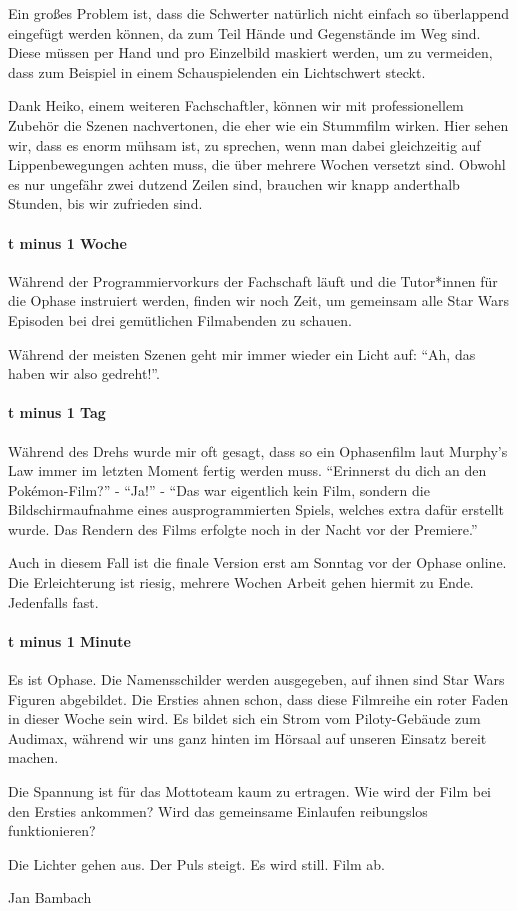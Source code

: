 {Ein großes Problem ist, dass die Schwerter natürlich nicht einfach so
überlappend eingefügt werden können, da zum Teil Hände und Gegenstände im Weg
sind. Diese müssen per Hand und pro Einzelbild maskiert werden, um zu
vermeiden, dass zum Beispiel in einem Schauspielenden ein Lichtschwert steckt.

Dank Heiko, einem weiteren Fachschaftler, können wir mit professionellem
Zubehör die Szenen nachvertonen, die eher wie ein Stummfilm wirken. Hier sehen
wir, dass es enorm mühsam ist, zu sprechen, wenn man dabei gleichzeitig
auf Lippenbewegungen achten muss, die über mehrere Wochen versetzt sind. Obwohl
es nur ungefähr zwei dutzend Zeilen sind, brauchen wir knapp anderthalb
Stunden, bis wir zufrieden sind.
\paragraph{t minus 1 Woche}
Während der Programmiervorkurs der Fachschaft läuft und die Tutor*innen für die
Ophase instruiert werden, finden wir noch Zeit, um gemeinsam alle Star Wars
Episoden bei drei gemütlichen Filmabenden zu schauen.


Während der meisten Szenen geht mir immer wieder ein Licht auf: \enquote{Ah, das haben
wir also gedreht!}.


\paragraph{t minus 1 Tag}
Während des Drehs wurde mir oft gesagt, dass so ein Ophasenfilm laut Murphy’s
Law immer im letzten Moment fertig werden muss. \enquote{Erinnerst du dich an den
Pokémon-Film?} - \enquote{Ja!} - \enquote{Das war eigentlich kein Film, sondern die
Bildschirmaufnahme eines ausprogrammierten Spiels, welches extra dafür erstellt
wurde. Das Rendern des Films erfolgte noch in der Nacht vor der Premiere.}


Auch in diesem Fall ist die finale Version erst am Sonntag vor der Ophase
online. Die Erleichterung ist riesig, mehrere Wochen Arbeit gehen hiermit zu
Ende. Jedenfalls fast. 
\paragraph{t minus 1 Minute}
Es ist Ophase. Die Namensschilder werden ausgegeben, auf ihnen sind Star Wars
Figuren abgebildet. Die Ersties ahnen schon, dass diese Filmreihe ein roter
Faden in dieser Woche sein wird. Es bildet sich ein Strom vom Piloty-Gebäude
zum Audimax, während wir uns ganz hinten im Hörsaal auf unseren Einsatz bereit
machen.


Die Spannung ist für das Mottoteam kaum zu ertragen. Wie wird der Film bei
den Ersties ankommen? Wird das gemeinsame Einlaufen reibungslos funktionieren?


Die Lichter gehen aus. Der Puls steigt. Es wird still. Film ab.
}
{Jan Bambach} 
\vfill
{}
\vfill
\pagebreak
